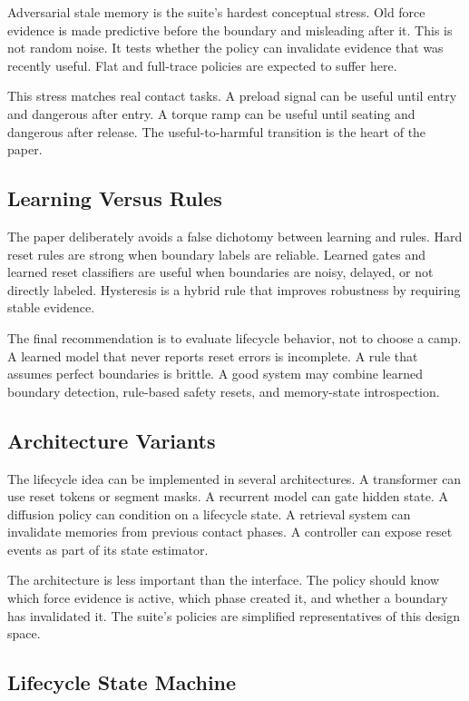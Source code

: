 \documentclass{article}
\begin{document}
Adversarial stale memory is the suite's hardest conceptual stress. Old force
evidence is made predictive before the boundary and misleading after it. This
is not random noise. It tests whether the policy can invalidate evidence that
was recently useful. Flat and full-trace policies are expected to suffer here.

This stress matches real contact tasks. A preload signal can be useful until
entry and dangerous after entry. A torque ramp can be useful until seating and
dangerous after release. The useful-to-harmful transition is the heart of the
paper.

\subsection{Learning Versus Rules}

The paper deliberately avoids a false dichotomy between learning and rules.
Hard reset rules are strong when boundary labels are reliable. Learned gates
and learned reset classifiers are useful when boundaries are noisy, delayed, or
not directly labeled. Hysteresis is a hybrid rule that improves robustness by
requiring stable evidence.

The final recommendation is to evaluate lifecycle behavior, not to choose a
camp. A learned model that never reports reset errors is incomplete. A rule
that assumes perfect boundaries is brittle. A good system may combine learned
boundary detection, rule-based safety resets, and memory-state introspection.

\subsection{Architecture Variants}

The lifecycle idea can be implemented in several architectures. A transformer
can use reset tokens or segment masks. A recurrent model can gate hidden state.
A diffusion policy can condition on a lifecycle state. A retrieval system can
invalidate memories from previous contact phases. A controller can expose reset
events as part of its state estimator.

The architecture is less important than the interface. The policy should know
which force evidence is active, which phase created it, and whether a boundary
has invalidated it. The suite's policies are simplified representatives of this
design space.

\subsection{Lifecycle State Machine}
\end{document}

